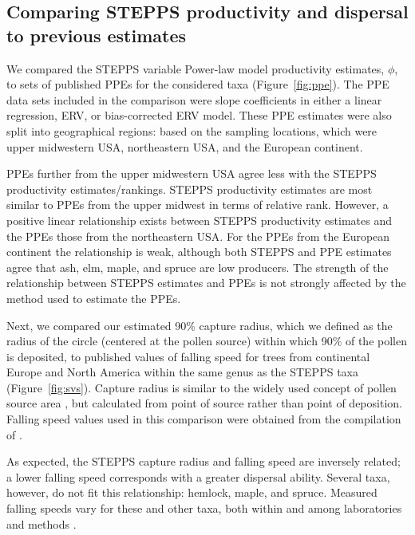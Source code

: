 \documentclass[12pt]{article}
\begin{document}
\subsection{Comparing STEPPS productivity and dispersal to previous
  estimates}

We compared the STEPPS variable Power-law model productivity
estimates, $\phi$, to sets of published PPEs for the considered taxa
(Figure~\ref{fig:ppe}). The PPE data sets included in the comparison
were slope coefficients in either a linear regression, ERV, or
bias-corrected ERV model. These PPE estimates were also split into
geographical regions: based on the sampling locations, which were
upper midwestern USA, northeastern USA, and the European
continent. %

PPEs further from the upper midwestern USA agree less with the STEPPS
productivity estimates/rankings.  STEPPS productivity estimates are
most similar to PPEs from the upper midwest in terms of relative
rank. However, a positive linear relationship exists between STEPPS
productivity estimates and the PPEs those from the northeastern
USA. For the PPEs from the European continent the relationship is
weak, although both STEPPS and PPE estimates agree that ash, elm,
maple, and spruce are low producers. The strength of the relationship
between STEPPS estimates and PPEs is not strongly affected by the
method used to estimate the PPEs.

Next, we compared our estimated 90\% capture radius, which we defined
as the radius of the circle (centered at the pollen source) within
which 90\% of the pollen is deposited, to published values of falling
speed for trees from continental Europe and North America within the
same genus as the STEPPS taxa (Figure~\ref{fig:svs}). Capture radius
is similar to the widely used concept of pollen source area
\citep{sugita1994pollen}, but calculated from point of source rather
than point of deposition. Falling speed values used in this comparison
were obtained from the compilation of \citet{jackson1999pollen}.


As expected, the STEPPS capture radius and falling speed are inversely
related; a lower falling speed corresponds with a greater dispersal
ability. Several taxa, however, do not fit this relationship: hemlock,
maple, and spruce. Measured falling speeds vary for these and other
taxa, both within and among laboratories and methods
\citep{jackson1999pollen}.
\end{document}
